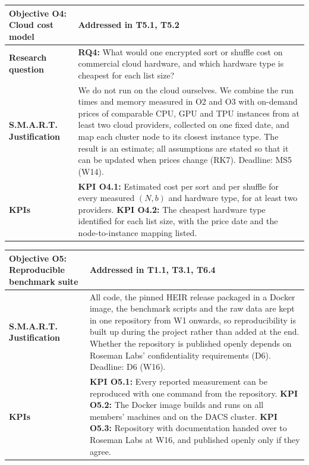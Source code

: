 \begin{table}[htbp]
\centering
\renewcommand{\arraystretch}{1.3}
\begin{tabularx}{\textwidth}{|p{}|L|}
\hline
\textbf{Objective O4: Cloud cost model} & \textbf{Addressed in T5.1, T5.2} \\ \hline
\textbf{Research question} & \textbf{RQ4:} What would one encrypted sort or shuffle cost on commercial cloud hardware, and which hardware type is cheapest for each list size? \\ \hline
\textbf{S.M.A.R.T. Justification} & We do not run on the cloud ourselves. We combine the run times and memory measured in O2 and O3 with on-demand prices of comparable CPU, GPU and TPU instances from at least two cloud providers, collected on one fixed date, and map each cluster node to its closest instance type. The result is an estimate; all assumptions are stated so that it can be updated when prices change (RK7). Deadline: MS5 (W14). \\ \hline
\textbf{KPIs} & \textbf{KPI O4.1:} Estimated cost per sort and per shuffle for every measured $(N, b)$ and hardware type, for at least two providers. \newline \textbf{KPI O4.2:} The cheapest hardware type identified for each list size, with the price date and the node-to-instance mapping listed. \\ \hline
\end{tabularx}
\end{table}

\begin{table}[htbp]
\centering
\renewcommand{\arraystretch}{1.3}
\begin{tabularx}{\textwidth}{|p{}|L|}
\hline
\textbf{Objective O5: Reproducible benchmark suite} & \textbf{Addressed in T1.1, T3.1, T6.4} \\ \hline
\textbf{S.M.A.R.T. Justification} & All code, the pinned HEIR release packaged in a Docker image, the benchmark scripts and the raw data are kept in one repository from W1 onwards, so reproducibility is built up during the project rather than added at the end. Whether the repository is published openly depends on Roseman Labs' confidentiality requirements (D6). Deadline: D6 (W16). \\ \hline
\textbf{KPIs} & \textbf{KPI O5.1:} Every reported measurement can be reproduced with one command from the repository. \newline \textbf{KPI O5.2:} The Docker image builds and runs on all members' machines and on the DACS cluster. \newline \textbf{KPI O5.3:} Repository with documentation handed over to Roseman Labs at W16, and published openly only if they agree. \\ \hline
\end{tabularx}
\end{table}

